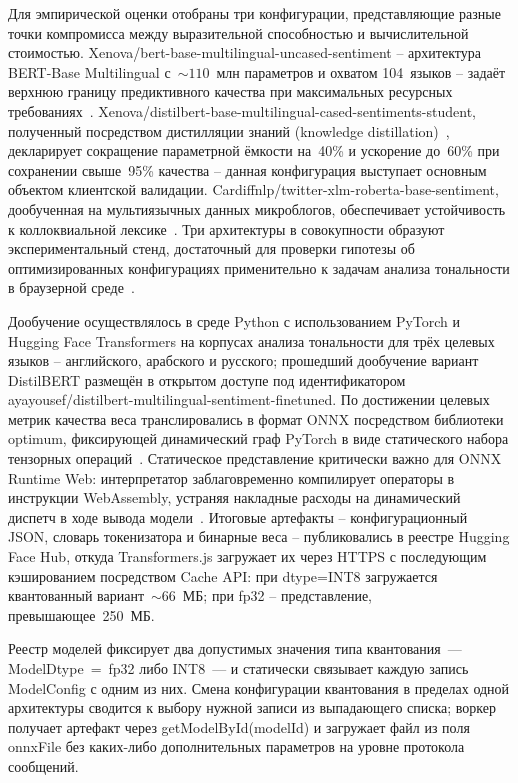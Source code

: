 Для эмпирической оценки отобраны три конфигурации, представляющие разные точки компромисса между выразительной способностью и вычислительной стоимостью. Xenova/bert-base-multilingual-uncased-sentiment – архитектура BERT-Base Multilingual с~${\sim}110$~млн параметров и охватом 104~языков – задаёт верхнюю границу предиктивного качества при максимальных ресурсных требованиях~\cite{krasitskii2025sentiment, hasan2024ensemble}. Xenova/distilbert-base-multilingual-cased-sentiments-student, полученный посредством дистилляции знаний (knowledge distillation)~\cite{sanh2019distilbert, xu2024distillation}, декларирует сокращение параметрной ёмкости на~40\% и ускорение до~60\% при сохранении свыше~95\% качества – данная конфигурация выступает основным объектом клиентской валидации. Cardiffnlp/twitter-xlm-roberta-base-sentiment, дообученная на мультиязычных данных микроблогов, обеспечивает устойчивость к коллоквиальной лексике~\cite{li2024multilingual}. Три архитектуры в совокупности образуют экспериментальный стенд, достаточный для проверки гипотезы об оптимизированных конфигурациях применительно к задачам анализа тональности в браузерной среде~\cite{liu2024mobilellm}.

Дообучение осуществлялось в среде Python с использованием PyTorch и Hugging Face Transformers на корпусах анализа тональности для трёх целевых языков – английского, арабского и русского; прошедший дообучение вариант DistilBERT размещён в открытом доступе под идентификатором ayayousef/distilbert-multilingual-sentiment-finetuned. По достижении целевых метрик качества веса транслировались в формат ONNX посредством библиотеки optimum, фиксирующей динамический граф PyTorch в виде статического набора тензорных операций~\cite{tang2024transformer}. Статическое представление критически важно для ONNX Runtime Web: интерпретатор заблаговременно компилирует операторы в инструкции WebAssembly, устраняя накладные расходы на динамический диспетч в ходе вывода модели~\cite{wang2024anatomizing}. Итоговые артефакты – конфигурационный JSON, словарь токенизатора и бинарные веса – публиковались в реестре Hugging Face Hub, откуда Transformers.js загружает их через HTTPS с последующим кэшированием посредством Cache API: при dtype=INT8 загружается квантованный вариант~${\sim}66$~МБ; при fp32 – представление, превышающее~250~МБ.

Реестр моделей фиксирует два допустимых значения типа квантования~— ModelDtype~=~fp32 либо INT8~— и статически связывает каждую запись ModelConfig с одним из них. Смена конфигурации квантования в пределах одной архитектуры сводится к выбору нужной записи из выпадающего списка; воркер получает артефакт через getModelById(modelId) и загружает файл из поля onnxFile без каких-либо дополнительных параметров на уровне протокола сообщений.

